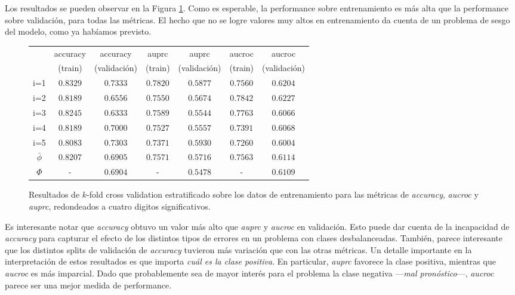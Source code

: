 Los resultados se pueden observar en la Figura \ref{metricas_modelo}. Como es esperable, la performance sobre entrenamiento es más alta que la performance sobre validación, para todas las métricas. El hecho que no se logre valores muy altos en entrenamiento da cuenta de un problema de sesgo del modelo, como ya habíamos previsto. 

\vspace{0.5em}
\begin{figure}[!htbp]
\begin{center}
\begin{tabular}{ |c|c|c|c|c|c|c| } 
\hline
            & accuracy  & accuracy      & auprc     & auprc         & aucroc   & aucroc      \\
            & (train)   & (validación)  & (train)   & (validación)  & (train)   & (validación) \\      
\hline
i=1         & $0.8329$  & $0.7333$      & $0.7820$  & $0.5877$      & $0.7560$  & $0.6204$ \\
i=2         & $0.8189$  & $0.6556$      & $0.7550$  & $0.5674$      & $0.7842$  & $0.6227$ \\
i=3         & $0.8245$  & $0.6333$      & $0.7589$  & $0.5544$      & $0.7763$  & $0.6066$ \\
i=4         & $0.8189$  & $0.7000$      & $0.7527$  & $0.5557$      & $0.7391$  & $0.6068$ \\
i=5         & $0.8083$  & $0.7303$      & $0.7371$  & $0.5930$      & $0.7260$  & $0.6004$ \\
$\bar\phi$  & $0.8207$  & $0.6905$      & $0.7571$  & $0.5716$      & $0.7563$  & $0.6114$ \\
$\Phi$      & -         & $0.6904$      & -         & $0.5478$      & -         & $0.6109$ \\
\hline
\end{tabular}
\end{center}
\caption{Resultados de $k$-fold cross validation estratificado sobre los datos de entrenamiento para las métricas de \textit{accuracy}, \textit{aucroc} y \textit{auprc}, redondeados a cuatro digitos significativos.}\label{metricas_modelo}
\end{figure}

Es interesante notar que \textit{accuracy} obtuvo un valor más alto que \textit{auprc} y \textit{aucroc} en validación. Esto puede dar cuenta de la incapacidad de \textit{accuracy} para capturar el efecto de los distintos tipos de errores en un problema con clases desbalanceadas. También, parece interesante que los distintos splits de validación de \textit{accuracy} tuvieron más variación que con las otras métricas. Un detalle importante en la interpretación de estos resultados es que importa \textit{cuál es la clase positiva}. En particular, \textit{auprc} favorece la clase positiva, mientras que \textit{aucroc} es más imparcial. Dado que probablemente sea de mayor interés para el problema la clase negativa ---\textit{mal pronóstico}---, \textit{aucroc} parece ser una mejor medida de performance.

